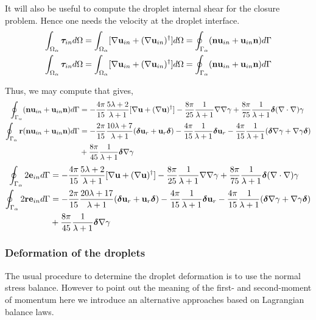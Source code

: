 It will also be useful to compute the droplet internal shear for the closure problem. 
Hence one needs the velocity at the droplet interface. 
\begin{align}
    \int_{\Omega_{\alpha}} \bm\tau_{in} d\Omega
    =
    \int_{\Omega_{\alpha}} [
        \mathbf{\nabla} \textbf{u}_{in} 
        + 
        (\mathbf{\nabla} \textbf{u}_{in})^\dagger
    ] d\Omega
    =
    \oint_{\Gamma_{\alpha}} (\textbf{n} \textbf{u}_{in} + \textbf{u}_{in} \textbf{n}) d\Gamma\\
    \int_{\Omega_{\alpha}} \bm\tau_{in} d\Omega
    =
    \int_{\Omega_{\alpha}} [
        \mathbf{\nabla} \textbf{u}_{in} 
        + 
        (\mathbf{\nabla} \textbf{u}_{in})^\dagger
    ] d\Omega
    =
    \oint_{\Gamma_{\alpha}} (\textbf{n} \textbf{u}_{in} + \textbf{u}_{in} \textbf{n}) d\Gamma
\end{align}

Thus, we may compute that gives,
\begin{align*}
    \oint_{\Gamma_{\alpha}} (\textbf{n} \textbf{u}_{in} + \textbf{u}_{in} \textbf{n}) d\Gamma
    &=
    -\frac{4\pi}{15}\frac{5\lambda +2}{\lambda+1}
    [\mathbf{\nabla} \textbf{u}+ (\mathbf{\nabla} \textbf{u})^\dagger]
    - \frac{8\pi}{25}\frac{1}{\lambda+1}
    \mathbf{\nabla}\mathbf{\nabla} \gamma
    + \frac{8\pi}{75}\frac{1}{\lambda+1}
    \bm\delta(\mathbf{\nabla}\cdot\mathbf{\nabla}) \gamma\\
    \oint_{\Gamma_{\alpha}} \textbf{r}(\textbf{n} \textbf{u}_{in} + \textbf{u}_{in} \textbf{n}) d\Gamma
    &=
    -\frac{2\pi}{15}\frac{10\lambda +7}{\lambda+1}
    (\bm\delta \textbf{u}_r + \textbf{u}_r \bm\delta)
    -\frac{4\pi}{15}\frac{1}{\lambda+1}\bm\delta \textbf{u}_r
    -\frac{4\pi}{15}\frac{1}{\lambda+1}
    (\bm\delta \mathbf{\nabla} \gamma + \mathbf{\nabla} \gamma \bm\delta)\\
    &+\frac{8\pi}{45}\frac{1}{\lambda+1}
    \bm\delta \mathbf{\nabla} \gamma
\end{align*}
\begin{align*}
    \oint_{\Gamma_{\alpha}} 2\textbf{e}_{in} d\Gamma
    &=
    -\frac{4\pi}{15}\frac{5\lambda +2}{\lambda+1}
    [\mathbf{\nabla} \textbf{u}+ (\mathbf{\nabla} \textbf{u})^\dagger]
    - \frac{8\pi}{25}\frac{1}{\lambda+1}
    \mathbf{\nabla}\mathbf{\nabla} \gamma
    + \frac{8\pi}{75}\frac{1}{\lambda+1}
    \bm\delta(\mathbf{\nabla}\cdot\mathbf{\nabla}) \gamma\\
    \oint_{\Gamma_{\alpha}} 2\textbf{r}\textbf{e}_{in} d\Gamma
    &=
    -\frac{2\pi}{15}\frac{20\lambda + 17}{\lambda+1}
    (\bm\delta \textbf{u}_r + \textbf{u}_r \bm\delta)
    -\frac{4\pi}{15}\frac{1}{\lambda+1}\bm\delta \textbf{u}_r
    -\frac{4\pi}{15}\frac{1}{\lambda+1}
    (\bm\delta \mathbf{\nabla} \gamma + \mathbf{\nabla} \gamma \bm\delta)\\
    &+\frac{8\pi}{45}\frac{1}{\lambda+1}
    \bm\delta \mathbf{\nabla} \gamma
\end{align*}

\subsubsection*{Deformation of the droplets}
The usual procedure to determine the droplet deformation is to use the normal stress balance. 
However to point out the meaning of the first- and second-moment of momentum here we introduce an alternative approaches based on Lagrangian balance laws. 

